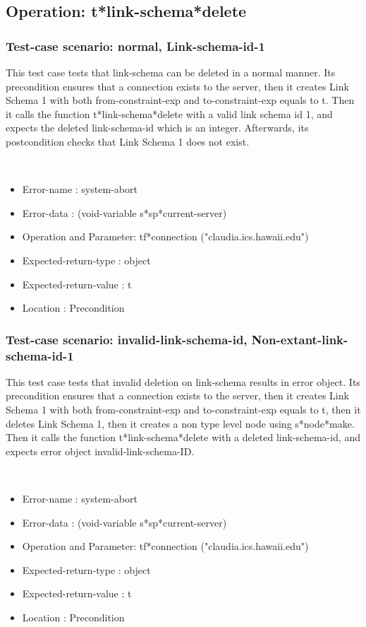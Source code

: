 \subsection {Operation: t*link-schema*delete}
\subsubsection {Test-case scenario: normal, Link-schema-id-1}


This test case tests that link-schema can be deleted in a normal manner.
Its precondition ensures that a connection exists to the server, then it creates Link Schema 1 with both from-constraint-exp and to-constraint-exp equals to t.
Then it calls the function t*link-schema*delete  with a valid link schema id 1, and expects the deleted link-schema-id which is an integer.
Afterwards, its postcondition checks that Link Schema 1 does not exist.


\
\begin {itemize}
\item 	Error-name             : system-abort
\item Error-data             : (void-variable s*sp*current-server)
\item Operation and Parameter: tf*connection ("claudia.ics.hawaii.edu")
\item Expected-return-type   : object
\item Expected-return-value  : t
\item Location               : Precondition



\end {itemize}
\subsubsection {Test-case scenario: invalid-link-schema-id, Non-extant-link-schema-id-1}


This test case tests that invalid deletion on link-schema results in error object.
Its precondition ensures that a connection exists to the server, then it creates Link Schema 1 with both from-constraint-exp and to-constraint-exp equals to t, then it deletes Link Schema 1, then it creates a non type level node using s*node*make.
Then it calls the function t*link-schema*delete  with a deleted link-schema-id, and expects error object invalid-link-schema-ID.



\
\begin {itemize}
\item 	Error-name             : system-abort
\item Error-data             : (void-variable s*sp*current-server)
\item Operation and Parameter: tf*connection ("claudia.ics.hawaii.edu")
\item Expected-return-type   : object
\item Expected-return-value  : t
\item Location               : Precondition



\end {itemize}
